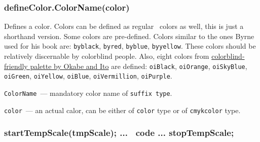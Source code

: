 

\subsubsection{defineColor.ColorName(color)}\label{defineColor}
	
	Defines a color. Colors can be defined as regular \METAPOST\ colors as well, this is just a shorthand version. Some colors are pre-defined. Colors similar to the ones Byrne used for his book are: \texttt{byblack}, \texttt{byred}, \texttt{byblue}, \texttt{byyellow}. These colors should be relatively discernable by colorblind people. Also, eight colors from \href{https://jfly.uni-koeln.de/color/}{colorblind-friendly palette by Okabe and Ito} \cite{Okabi2008} are defined: \texttt{oiBlack}, \texttt{oiOrange}, \texttt{oiSkyBlue}, \texttt{oiGreen}, \texttt{oiYellow}, \texttt{oiBlue}, \texttt{oiVermillion}, \texttt{oiPurple}.

	\texttt{ColorName}~— mandatory color name of \texttt{suffix type}.
	
	\texttt{color}~— an actual calor, can be either of \texttt{color} type or of \texttt{cmykcolor} type.

	

	

\subsubsection{startTempScale(tmpScale); ... \METAPOST\ code ... stopTempScale;}\label{startTempScale}


